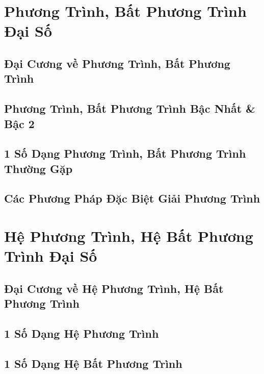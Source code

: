 \documentclass{article}
\numberwithin{equation}{section}
\begin{document}

\section{Phương Trình, Bất Phương Trình Đại Số}

\subsection{Đại Cương về Phương Trình, Bất Phương Trình}


\subsection{Phương Trình, Bất Phương Trình Bậc Nhất \& Bậc 2}


\subsection{1 Số Dạng Phương Trình, Bất Phương Trình Thường Gặp}


\subsection{Các Phương Pháp Đặc Biệt Giải Phương Trình}


\section{Hệ Phương Trình, Hệ Bất Phương Trình Đại Số}


\subsection{Đại Cương về Hệ Phương Trình, Hệ Bất Phương Trình}


\subsection{1 Số Dạng Hệ Phương Trình}


\subsection{1 Số Dạng Hệ Bất Phương Trình}


\printbibliography[heading=bibintoc]
	
\end{document}
